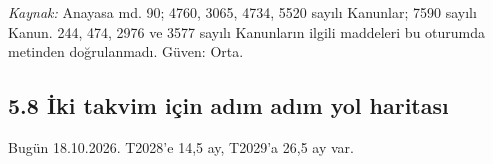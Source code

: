 \endgroup

\emph{Kaynak:} \etiketV{} Anayasa md. 90; 4760, 3065, 4734, 5520 sayılı Kanunlar; 7590 sayılı Kanun. \etiketD{} 244, 474, 2976 ve 3577 sayılı Kanunların ilgili maddeleri bu oturumda metinden doğrulanmadı. Güven: Orta.

\hypertarget{02b_secenekler_hukuk-58-iux307ki-takvim-iuxe7in-adux131m-adux131m-yol-haritasux131}{%
\subsection{5.8 İki takvim için adım adım yol haritası}\label{02b_secenekler_hukuk-58-iux307ki-takvim-iuxe7in-adux131m-adux131m-yol-haritasux131}}

Bugün 18.10.2026. T2028'e 14,5 ay, T2029'a 26,5 ay var.

\begingroup\gbtablo\footnotesize

